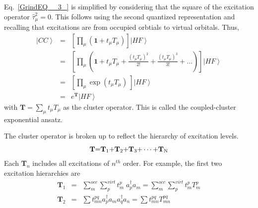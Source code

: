 \documentclass[11pt,oneside,final]{huthesis}%
\begin{document}



Eq.~\eqref{GrindEQ__3_} is simplified by considering that the square of the excitation operator ${\hat{\tau }}^2_{\mu }=0$.  This follows using the second  quantized representation and recalling that excitations are from occupied orbtials to virtual orbitals.  Thus,
\begin{eqnarray}
\left|CC\right\rangle &=&\left[\prod_{\mu }{\left({\mathbf 1}+t_{\mu }{T }_{\mu }\right)}\right]\left|HF\right\rangle \nonumber\\
&=&\left[\prod_{\mu }{\left({\mathbf 1}+t_{\mu }{T}_{\mu }+\frac{{\left(t_{\mu }{T}_{\mu }\right)}^2}{2!}+\frac{{\left(t_{\mu }{T}_{\mu }\right)}^3}{3!}+\dots \right)}\right]\left|HF\right\rangle\nonumber\\ 
&=&\left[\prod_{\mu }{{\exp  \left(t_{\mu }{T}_{\mu }\right)\ }}\right]\left|HF\right\rangle\nonumber\\ 
&=&{  e^{\mathbf T} }\left|HF\right\rangle
\end{eqnarray} 
with ${\mathbf T}{\mathbf =}\sum_{\mu }{t_{\mu }{T}_{\mu }}$ as the cluster operator.  This is called the {coupled-cluster exponential ansatz}. 

The cluster operator is broken up to reflect the hierarchy of excitation levels.
\begin{equation} \label{GrindEQ__7_} 
{\mathbf T}{\mathbf =}{{\mathbf T}}_{{\rm 1}}{\mathbf +}{{\mathbf T}}_{{\rm 2}}{\mathbf +}{{\mathbf T}}_{{\rm 3}}{\mathbf +\dots +}{{\mathbf T}}_{{\rm N}} 
\end{equation} 
Each \textbf{T}${}_{n}$ includes all excitations of $n^{th}$ order. For example, the first two excitation hierarchies are 
\begin{eqnarray}
{\mathbf T}_{1} &=&\sum_{m}^{occ} \sum_{p}^{virt}{t^p_m \; a^{\dagger }_pa_m} =\sum_{m}^{occ} \sum_{p}^{virt}{t^p_m{T}^p_m}\\
{{\mathbf T}}_2&=&\sum{t^{pq}_{mn}}a^{\dagger }_pa_ma^{\dagger }_qa_n= \sum{t^{pq}_{mn}}{T}^{pq}_{mn}
 \end{eqnarray} 
\end{document}

